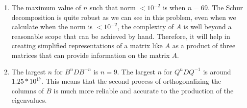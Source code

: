 \documentclass{article}
\begin{document}
\begin{enumerate}
    \item
    
    The maximum value of $n$ such that norm $<10^{-2}$ is when $n=69$. The Schur decomposition is quite robust as we can see in this problem, even when we calculate when the norm is $<10^{-2}$, the complexity of $A$ is well beyond a reasonable scope that can be achieved by hand. Therefore, it will help in creating simplified representations of a matrix like $A$ as a product of three matrices that can provide information on the matrix $A.$
    
    \item
    
    The largest $n$ for $B^n D B^{-n}$ is $n=9$. The largest $n$ for $Q^nDQ^{-1}$ is around $1.25*10^{17}$. This means that the second process of orthogonalizing the columns of $B$ is much more reliable and accurate to the production of the eigenvalues.
    
\end{enumerate}
\end{document}
